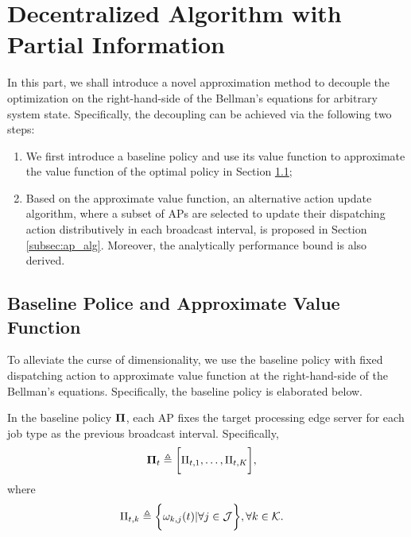 \section{Decentralized Algorithm with Partial Information}
\label{sec:algorithm}

In this part, we shall introduce a novel approximation method to decouple the optimization on the right-hand-side of the Bellman's equations for arbitrary system state.
Specifically, the decoupling can be achieved via the following two steps:
\begin{enumerate}
    \item We first introduce a baseline policy and use its value function to approximate the value function of the optimal policy in Section \ref{subsec:baseline};
    \item Based on the approximate value function, an alternative action update algorithm, where a subset of APs are selected to update their dispatching action distributively in each broadcast interval, is proposed in Section \ref{subsec:ap_alg}.
    Moreover, the analytically performance bound is also derived.
\end{enumerate}

\subsection{Baseline Police and Approximate Value Function}
\label{subsec:baseline}
To alleviate the curse of dimensionality, we use the baseline policy with fixed dispatching action to approximate value function at the right-hand-side of the Bellman's equations.
Specifically, the baseline policy is elaborated below.

\begin{policy}
    In the baseline policy $\boldsymbol{\Pi}$, each AP fixes the target processing edge server for each job type as the previous broadcast interval. Specifically,
    \begin{align}
        \boldsymbol{\Pi}_{t} &\triangleq \bigg[ \Pi_{t,1}, \dots, \Pi_{t,K} \bigg],
    \end{align}
    where 
    \begin{align}
        \Pi_{t,k} &\triangleq \bigg\{
            \omega_{k,j}(t) | \forall j\in\mathcal{J}
        \bigg\}, \forall k\in\mathcal{K}.
    \end{align}
\end{policy}

